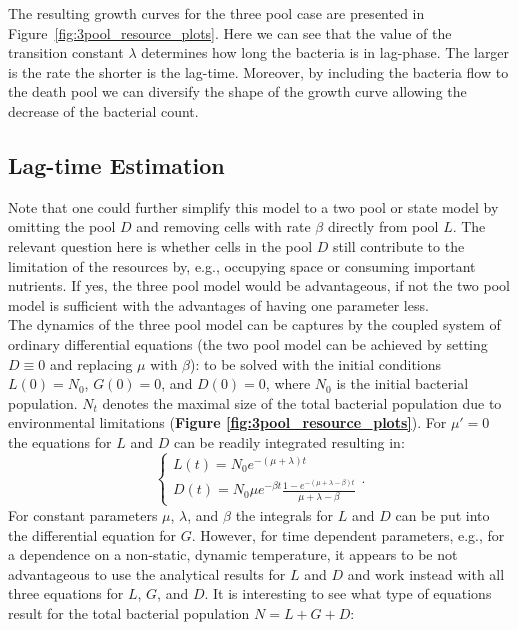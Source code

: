\documentclass[10pt,A4paper]{article}
\begin{document}
The resulting growth curves for the three pool case are presented in Figure~\ref{fig:3pool_resource_plots}.
Here we can see that the value of the transition constant $\lambda$ determines how long the bacteria is in lag-phase.
The larger is the rate the shorter is the lag-time.
Moreover, by including the bacteria flow to the death pool we can diversify the shape of the growth curve allowing the decrease of the bacterial count.
%
%
%
\subsection{Lag-time Estimation}
Note that one could further simplify this model to a two pool or state model by omitting the pool $D$ and removing cells with rate $\beta$ directly from pool $L$. 
The relevant question here is whether cells in the pool $D$ still contribute to the limitation of the resources by, e.g., occupying space or consuming important nutrients. 
If yes, the three pool model would be advantageous, if not the two pool model is sufficient with the advantages of having one parameter less.\\
%
The dynamics of the three pool model can be captures by the coupled system of ordinary differential equations (the two pool model can be achieved by setting $D\equiv 0$ and replacing $\mu$ with $\beta$):
to be solved with the initial conditions $L(0)=N_0$, $G(0)=0$, and $D(0)=0$, where $N_0$ is the initial bacterial population. 
$N_t$ denotes the maximal size of the total bacterial population due to environmental limitations (\textbf{Figure \ref{fig:3pool_resource_plots}}). 
For $\mu'=0$ the equations for $L$ and $D$ can be readily integrated resulting in:
\begin{equation}
    \begin{cases}
        L(t) = N_0 e^{-(\mu+\lambda)t}\\
        D(t) = N_0 \mu e^{-\beta t}\frac{1-e^{-(\mu+\lambda-\beta)t}}{\mu+\lambda-\beta}
    \end{cases}.
\end{equation}
For constant parameters $\mu$, $\lambda$, and $\beta$ the integrals for $L$ and $D$ can be put into the differential equation for $G$. 
However, for time dependent parameters, e.g., for a dependence on a non-static, dynamic temperature, it appears to be not advantageous to use the analytical results for $L$ and $D$ and work instead with all three equations for $L$, $G$, and $D$. 
It is interesting to see what type of equations result for the total bacterial population $N=L+G+D$:
\end{document}
